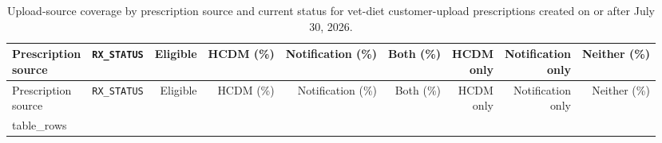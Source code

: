 \begin{longtable}{@{}llrrrrrrr@{}}
\caption{Upload-source coverage by prescription source and current status for vet-diet customer-upload prescriptions created on or after July 30, 2026.}
\label{tab:cmpu-approved-prescription-upload-coverage}\\
\toprule \shortstack[l]{Prescription\\source} & \texttt{RX\_STATUS} & Eligible & HCDM (\%) & Notification (\%) & Both (\%) & \shortstack{HCDM\\only} & \shortstack{Notification\\only} & Neither (\%) \\
\midrule
\endfirsthead
\toprule \shortstack[l]{Prescription\\source} & \texttt{RX\_STATUS} & Eligible & HCDM (\%) & Notification (\%) & Both (\%) & \shortstack{HCDM\\only} & \shortstack{Notification\\only} & Neither (\%) \\
\midrule
\endhead
{{ table_rows }}
\bottomrule
\end{longtable}
